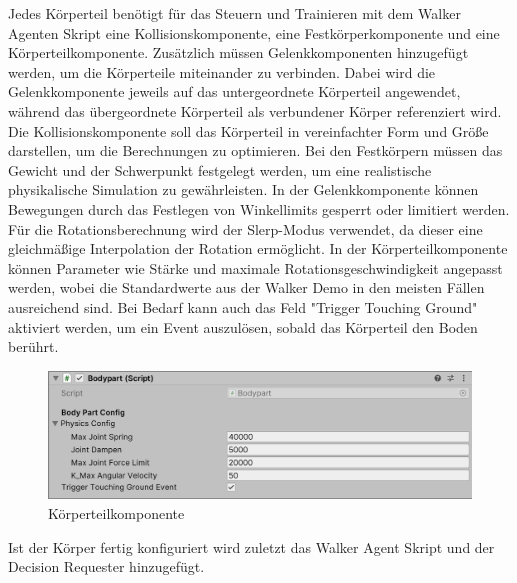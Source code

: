Jedes Körperteil benötigt für das Steuern und Trainieren mit dem Walker Agenten Skript eine Kollisionskomponente, eine Festkörperkomponente und eine Körperteilkomponente. Zusätzlich müssen Gelenkkomponenten hinzugefügt werden, um die Körperteile miteinander zu verbinden. Dabei wird die Gelenkkomponente jeweils auf das untergeordnete Körperteil angewendet, während das übergeordnete Körperteil als verbundener Körper referenziert wird. Die Kollisionskomponente soll das Körperteil in vereinfachter Form und Größe darstellen, um die Berechnungen zu optimieren. Bei den Festkörpern müssen das Gewicht und der Schwerpunkt festgelegt werden, um eine realistische physikalische Simulation zu gewährleisten. In der Gelenkkomponente können Bewegungen durch das Festlegen von Winkellimits gesperrt oder limitiert werden. Für die Rotationsberechnung wird der Slerp-Modus verwendet, da dieser eine gleichmäßige Interpolation der Rotation ermöglicht. In der Körperteilkomponente können Parameter wie Stärke und maximale Rotationsgeschwindigkeit angepasst werden, wobei die Standardwerte aus der Walker Demo in den meisten Fällen ausreichend sind. Bei Bedarf kann auch das Feld "Trigger Touching Ground" aktiviert werden, um ein Event auszulösen, sobald das Körperteil den Boden berührt.

\begin{figure}[H]
  \centering  
  \includegraphics[scale=0.5]{img/komponente_bodypart}
  \caption{Körperteilkomponente}
  \label{fig:komponente_bodypart}
\end{figure}


Ist der Körper fertig konfiguriert wird zuletzt das Walker Agent Skript und der Decision Requester hinzugefügt.

